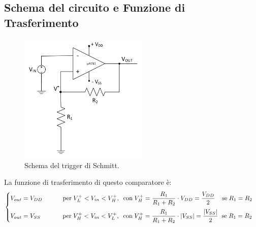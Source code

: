 \documentclass{report}
\begin{document}
\subsection{Schema del circuito e Funzione di Trasferimento}
\begin{figure}[h]
	\centering
	\includegraphics[height=6.2cm]{immagini/schema2}
	\caption{Schema del trigger di Schmitt.}
	\label{figura:schema2}
\end{figure}
\noindent La funzione di trasferimento di questo comparatore è:
\begin{equation}
   \begin{cases} %
   V_{out}= V_{DD}\;\indent\indent \mathrm{per\;}  V_L^+<V_{in}<V_H^+\mathrm{, \;\; con\;}\displaystyle{ V_H^+=\frac{R_1}{R_1+R_2}\cdot V_{DD}=\frac{V_{DD}}{2}}\mathrm{\;\;\;\; se \;} R_1=R_2\\[10pt]
   V_{out}= V_{SS}\;\;\indent\indent \mathrm{per\;} V_H^+<V_{in}<V_L^+\mathrm{, \;\; con\;}\displaystyle{ V_H^+=\frac{R_1}{R_1+R_2}\cdot |V_{SS}|=\frac{|V_{SS}|}{2}}\mathrm{\;\; se \;} R_1=R_2\\
   \end{cases}
\end{equation}
\end{document}
